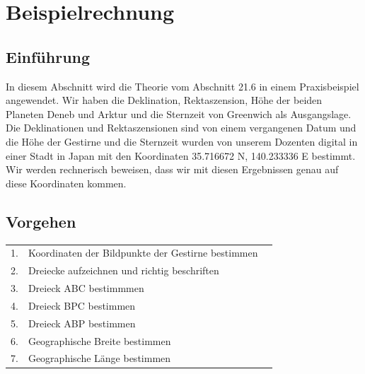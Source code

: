 \section{Beispielrechnung}

\subsection{Einführung}
In diesem Abschnitt wird die Theorie vom Abschnitt 21.6 in einem Praxisbeispiel angewendet. 
Wir haben die Deklination, Rektaszension, Höhe der beiden Planeten Deneb und Arktur und die Sternzeit von Greenwich als Ausgangslage.
Die Deklinationen und Rektaszensionen sind von einem vergangenen Datum und die Höhe der Gestirne und die Sternzeit wurden von unserem Dozenten digital in einer Stadt in Japan mit den Koordinaten 35.716672 N, 140.233336 E bestimmt.
Wir werden rechnerisch beweisen, dass wir mit diesen Ergebnissen genau auf diese Koordinaten kommen.
\subsection{Vorgehen}

\begin{center}
	\begin{tabular}{l l l}
		1. & Koordinaten der Bildpunkte der Gestirne bestimmen \\
		2. & Dreiecke aufzeichnen und richtig beschriften\\
		3. & Dreieck ABC bestimmmen\\
		4. & Dreieck BPC bestimmen \\
		5. & Dreieck ABP bestimmen \\ 
		6. & Geographische Breite bestimmen \\
		7. & Geographische Länge bestimmen \\
	\end{tabular}
\end{center}

